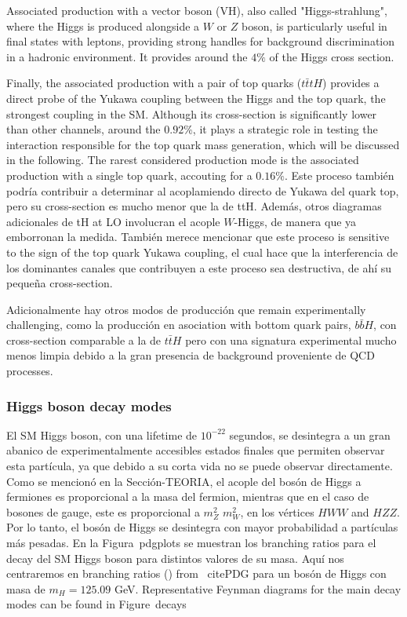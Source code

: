 \documentclass[11pt,twoside]{book}
\begin{document}
Associated production with a vector boson (VH), also called "Higgs-strahlung", where the Higgs is produced alongside a $W$ or $Z$ boson, is particularly useful in final states with leptons, providing strong handles for background discrimination in a hadronic environment. It provides around the $4\%$ of the Higgs cross section.

Finally, the associated production with a pair of top quarks ($t\bar{t}tH$) provides a direct probe of the Yukawa coupling between the Higgs and the top quark, the strongest coupling in the \acrshort{SM}. Although its cross-section is significantly lower than other channels, around the $0.92\%$, it plays a strategic role in testing the interaction responsible for the top quark mass generation, which will be discussed in the following.
The rarest considered production mode is the associated production with a single top quark, accouting for a $0.16\%$. Este proceso también podría contribuir a determinar al acoplamiendo directo de Yukawa del quark top, pero su cross-section es mucho menor que la de ttH. Además, otros diagramas adicionales de tH at LO involucran el acople $W$-Higgs, de manera que ya emborronan la medida. También merece mencionar que este proceso is sensitive to the sign of the top quark Yukawa coupling, el cual hace que la interferencia de los dominantes canales que contribuyen a este proceso sea destructiva,
de ahí su pequeña cross-section.

Adicionalmente hay otros modos de producción que remain experimentally challenging, como la producción en asociation with bottom quark pairs, $b\bar{b}H$, con cross-section comparable a la de $t\bar{t}H$ pero con una signatura experimental mucho menos limpia debido a la gran presencia de background proveniente de \acrshort{QCD} processes.

\subsubsection*{Higgs boson decay modes}
\label{sec:higgs_production}
El \acrshort{SM} Higgs boson, con una lifetime de $10^{-22}$ segundos, se desintegra a un gran abanico de experimentalmente accesibles estados finales que permiten observar esta partícula, ya que debido a su corta vida no se puede observar directamente.
Como se mencionó en la Sección-TEORIA, el acople del bosón de Higgs a fermiones es proporcional a la masa del fermion, mientras que en el caso de bosones de gauge, este es proporcional a $m^2_Z$ $m^2_W$, en los vértices $HWW$ and $HZZ$. Por lo tanto, el bosón de Higgs se desintegra con mayor probabilidad a partículas más pesadas. En la Figura~pdgplots se muestran los branching ratios para el decay del \acrshort{SM} Higgs boson para distintos valores de su masa. Aquí nos centraremos en branching ratios () from ~citePDG para un bosón de Higgs con masa de $m_{H} = 125.09$ GeV. Representative Feynman diagrams for the main decay modes can be found in Figure~decays
\end{document}
